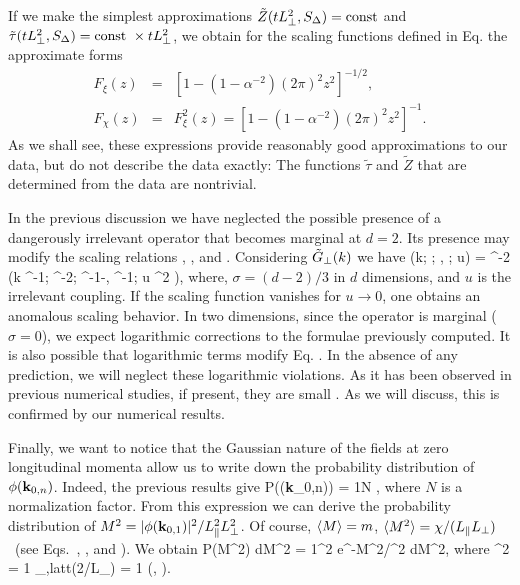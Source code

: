 \documentclass[12pt]{article}
\begin{document}
If we make the simplest approximations 
$\tilde{Z}(t L_{\bot}^2, S_\Delta) = {\rm const}$ and 
$\tilde{\tau}(t L_{\bot}^2, S_\Delta) = {\rm const}\  \times t L_{\bot}^2$, 
we obtain 
for the scaling functions defined in
Eq.  the approximate forms
\begin{eqnarray}
        F_{\xi}(z) &=& \left[ 1- \left(1 -\alpha^{-2}\right)(2\pi)^2 z^2
         \right]^{-1/2},
\label{eq:theoretical_pred} \\
F_{\chi} (z) &=& F_\xi^2(z) = 
   \left[1- \left(1 -\alpha^{-2}\right)(2\pi)^2 z^2\right]^{-1}.
\label{eq:theoretical_pred_chi} 
\end{eqnarray}
As we shall see, these expressions provide reasonably good 
approximations to our data, but do not describe the data exactly: The 
functions $\tilde{\tau}$ and $\tilde{Z}$ that are determined from the data 
are nontrivial.

In the previous discussion
we have neglected the possible presence of a dangerously irrelevant 
operator that becomes marginal at $d=2$. Its presence may modify
the scaling relations , ,
and . Considering $\tilde{G}_{\bot} (k)$ we 
have
\be
{} (k; \tau; , ; u) = 
   \mu^{-2}  \left(k \mu^{-1}; \tau \mu^{-2}; 
      \mu^{-1-\Delta}, \mu^{-1}; u \mu^{2\sigma} \right),
\ee
where, $\sigma = (d-2)/3$ in $d$ dimensions, and $u$ is the irrelevant 
coupling. If the scaling function vanishes for $u\to 0$, one obtains
an anomalous scaling behavior. In two dimensions, since the operator is 
marginal ($\sigma=0$), we expect logarithmic corrections to the 
formulae previously computed.
It is also possible that logarithmic terms modify 
Eq. . In the absence of any prediction, we will neglect
these logarithmic violations. As it has been observed in previous 
numerical studies, if present, they are small \cite{Leung92}. 
As we will discuss, this is confirmed by our numerical results.

Finally, we want to notice that the Gaussian nature of the fields 
at zero longitudinal momenta allow us to write down the 
probability distribution of $\phi({\bf k}_{0,n})$. 
Indeed, the previous results give 
\be
P(\phi({\bf k}_{0,n})) = {1\over N} \exp{},
\ee
where $N$ is a normalization factor. From this expression we can 
derive the probability distribution of 
$M^2 = |\phi({\bf k}_{0,1})|^2/L_{\|}^2 L_{\bot}^2$. 
Of course, $\langle M\rangle = m$, $\langle M^2\rangle = \chi/(L_{\|} L_{\bot})$\ 
(see Eqs.~, , and ). We obtain
\be
P(M^2) dM^2 = {1\over \sigma^2} e^{-M^2/\sigma^2} dM^2,
\label{prediction-M2-distribution}
\ee
where 
\be 
\sigma^2 = {1\over {} } _{\bot,\rm latt}(2\pi/L_\bot) = 
    {1\over \pa{L} \pe{L}} \chi(\pa{L}, \pe{L}).
\ee
\end{document}
